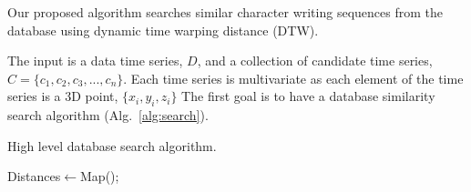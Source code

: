 

Our proposed algorithm searches similar character writing sequences from the database using dynamic time warping distance (DTW). 

The input is a data time series, \(D\), and a collection of candidate time series, \( C = \{c_1, c_2, c_3, ..., c_n\}\).
Each time series is multivariate as each element of the time series is a 3D point, \(\{x_i, y_i,z_i\}\)
The first goal is to have a database similarity search algorithm (Alg.~\ref{alg:search}).
\begin{algorithm}[h]
 \caption{High level database search algorithm.}
 \Input{\Collection, \D}
 Distances$\leftarrow$Map();\\
 \label{alg:search}
\end{algorithm}

